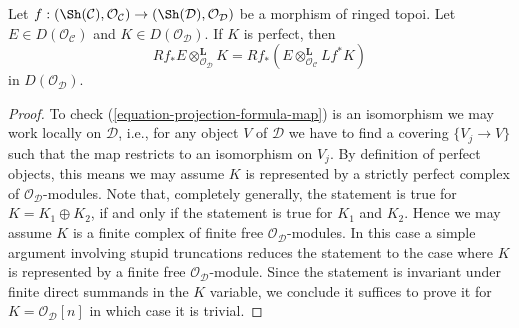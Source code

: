 \begin{lemma}
\label{lemma-projection-formula}
Let $f : (\Sh(\mathcal{C}), \mathcal{O}_\mathcal{C}) \to
(\Sh(\mathcal{D}), \mathcal{O}_\mathcal{D})$ be a morphism of ringed topoi.
Let $E \in D(\mathcal{O}_\mathcal{C})$ and $K \in D(\mathcal{O}_\mathcal{D})$.
If $K$ is perfect, then
$$
Rf_*E \otimes^\mathbf{L}_{\mathcal{O}_\mathcal{D}} K =
Rf_*(E \otimes^\mathbf{L}_{\mathcal{O}_\mathcal{C}} Lf^*K)
$$
in $D(\mathcal{O}_\mathcal{D})$.
\end{lemma}

\begin{proof}
To check (\ref{equation-projection-formula-map}) is an isomorphism
we may work locally on $\mathcal{D}$, i.e.,
for any object $V$ of $\mathcal{D}$ we have to find a covering $\{V_j \to V\}$
such that the map restricts to an isomorphism on $V_j$. By definition
of perfect objects, this means we may assume $K$ is represented by
a strictly perfect complex of $\mathcal{O}_\mathcal{D}$-modules.
Note that, completely generally, the statement is true for
$K = K_1 \oplus K_2$, if and only if the statement is true for
$K_1$ and $K_2$. Hence we may assume $K$ is a finite
complex of finite free $\mathcal{O}_\mathcal{D}$-modules.
In this case a simple argument involving stupid truncations reduces
the statement to the case where $K$ is represented by a finite
free $\mathcal{O}_\mathcal{D}$-module. Since the statement is invariant
under finite direct summands in the $K$ variable, we conclude
it suffices to prove it for $K = \mathcal{O}_\mathcal{D}[n]$
in which case it is trivial.
\end{proof}

